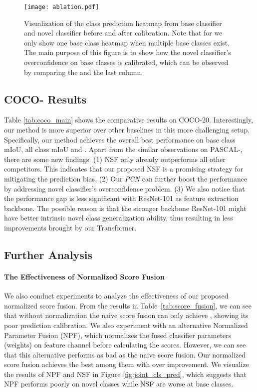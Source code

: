 \documentclass[journal]{IEEEtran}
\begin{document}
\begin{figure*}[ht]
    \centering
    \texttt{[image: ablation.pdf]}
\caption{Visualization of the class prediction heatmap from base classifier and novel classifier before and after calibration. Note that for  we only show one base class heatmap when multiple base classes exist. The main purpose of this figure is to show how the novel classifier's overconfidence on base classes is calibrated, which can be observed by comparing the  and the last column.}
    \label{fig:atten_com}
\end{figure*}

\subsection{COCO- Results}
Table \ref{tab:coco_main} shows the comparative results on COCO-20.
Interestingly, our method is more superior over other baselines in this more challenging setup.
Specifically, our method achieves the overall best performance on base class mIoU, all class mIoU and .
Apart from the similar observations on PASCAL-, there are some new findings.
(1) NSF only already outperforms all other competitors. 
This indicates that our proposed NSF is a promising strategy for mitigating the prediction bias.
(2) Our \textit{PCN} can further boost the performance by addressing novel classifier's overconfidence problem.
(3) We also notice that the performance gap is less significant with ResNet-101 as feature extraction backbone.
The possible reason is that the stronger backbone ResNet-101 might have better intrinsic novel class generalization ability, thus resulting in less improvements brought by our Transformer.

\subsection{Further Analysis}

\paragraph{The Effectiveness of Normalized Score Fusion}
We also conduct experiments to analyze the effectiveness of our proposed normalized score fusion. From the results in Table~\ref{tab:score_fusion}, we can see that without normalization the naive score fusion can only achieve  , showing its poor prediction calibration. 
We also experiment with an alternative Normalized Parameter Fusion (NPF), which normalizes the fused classifier parameters (weights) on feature channel before calculating the scores. 
However, we can see that this alternative performs as bad as the naive score fusion. 
Our normalized score fusion achieves the best among them with over   improvement. We visualize the results of NPF and NSF in Figure \ref{fig:joint_cls_pred}, which suggests that NPF performs poorly on novel classes while NSF are worse at base classes.
\end{document}
